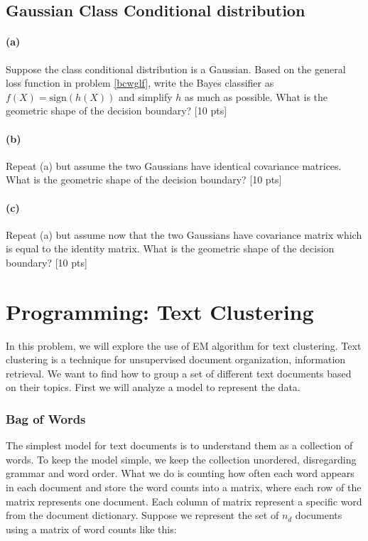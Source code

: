 \documentclass[twoside,10pt]{article}
\begin{document}
\subsection{Gaussian Class Conditional distribution}
\paragraph{(a)} Suppose the class conditional distribution is a Gaussian.
Based on the general loss function in problem \ref{bcwglf}, write
the Bayes classifier as $f(X) = \text{sign}(h(X))$ and simplify $h$
as much as possible. What is the geometric shape of the decision
boundary? [10 pts]

\paragraph{(b)} Repeat (a) but assume the two Gaussians have identical
covariance matrices. What is the geometric shape of the decision
boundary? [10 pts]

\paragraph{(c)} Repeat (a) but assume now that the two Gaussians have covariance
matrix which is equal to the identity matrix. What is the geometric
shape of the decision boundary? [10 pts]





\section{Programming: Text Clustering}

In this problem, we will explore the use of EM algorithm for text
clustering. Text clustering is a technique for unsupervised document
organization, information retrieval. We want to find how to group a
set of different text documents based on their topics. First we will
analyze a model to represent the data.

\subsubsection*{Bag of Words}
The simplest model for text documents is to understand them as a
collection of words. To keep the model simple, we keep the
collection unordered, disregarding grammar and word order. What we
do is counting how often each word appears in each document and
store the word counts into a matrix, where each row of the matrix
represents one document. Each column of matrix represent a specific
word from the document dictionary. Suppose we represent the set of
$n_d$ documents using a matrix of word counts like this:
\end{document}
